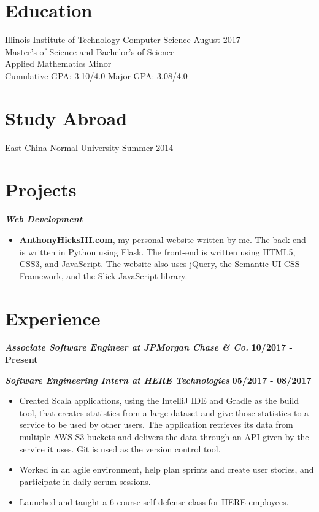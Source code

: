 \documentclass[10pt]{res}
\begin{document}
\address{www.anthonyhicksiii.com \\ https://github.com/TheRealMingo \\ https://www.codementor.io/anthonyhicks}
\address{anthony@anthonyhicksiii.com}

\setlength\itemsep{0em}

\begin{resume}
\section{Education}
	Illinois Institute of Technology \hfill
	{\centering Computer Science} 
	 \hfill August 2017 \\
	Master's of Science and Bachelor's of Science \\
	Applied Mathematics Minor \\
	Cumulative GPA: 3.10/4.0 \hfill
	Major GPA: 3.08/4.0 
\section{Study Abroad}
	East China Normal University \hfill Summer 2014  
\section{Projects} 
\textbf{\textit{Web Development}}
	\vspace*{.25em}
	\begin{itemize}
		\item \textbf{AnthonyHicksIII.com}, my personal website written by me. The back-end is written in Python using Flask. The front-end is written using HTML5, CSS3, and JavaScript. The website also uses jQuery, the Semantic-UI CSS Framework, and the Slick JavaScript library.
	\end{itemize}

\section{Experience}
	\textbf{\textit{Associate Software Engineer at JPMorgan Chase \& Co.}}
	\hfill{\bf 10/2017 - Present}

	\textbf{\textit{Software Engineering Intern at HERE Technologies}}
	\vspace*{.25em}
	\hfill{\bf 05/2017 - 08/2017}
	\begin{itemize}
		\item Created Scala applications, using the IntelliJ IDE and Gradle as the build tool, that creates statistics from a large dataset and give those statistics to a service to be used by other users. The application retrieves its data from multiple AWS S3 buckets and delivers the data through an API given by the service it uses. Git is used as the version control tool. 
\item Worked in an agile environment, help plan sprints and create user stories, and participate in daily scrum sessions. 
\item Launched and taught a 6 course self-defense class for HERE employees. 
	\end{itemize}


\end{resume}
\end{document}
